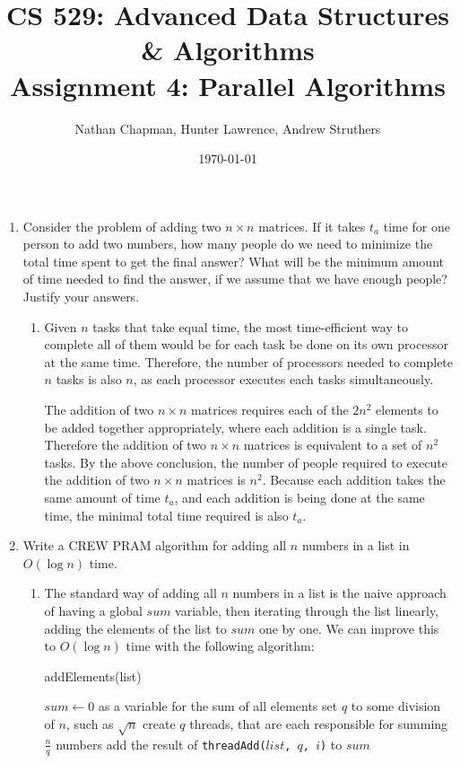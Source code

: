 \documentclass{article}
\title{\vspace*{-0.625in}CS 529: Advanced Data Structures \& Algorithms \\ Assignment 4: Parallel Algorithms}
\author{Nathan Chapman, Hunter Lawrence, Andrew Struthers}
\date{\today}
\renewcommand{\_}{\ifincsname_\else\legacyunderscore\fi}
\begin{document}
    \maketitle

\begin{enumerate}
	\item Consider the problem of adding two $n\times n$ matrices. If it takes $t_a$ time for one person to add two numbers, how many people do we need to minimize the total time spent to get the final answer? What will be the minimum amount of time needed to find the answer, if we assume that we have enough people? Justify your answers.
\begin{enumerate}
        \item

        Given $n$ tasks that take equal time, the most time-efficient way to complete all of them would be for each task be done on its own processor at the same time.  Therefore, the number of processors needed to complete $n$ tasks is also $n$, as each processor executes each tasks simultaneously.

        The addition of two $n \times n$ matrices requires each of the $2 n^2$ elements to be added together appropriately, where each addition is a single task.  Therefore the addition of two $n \times n$ matrices is equivalent to a set of $n^2$ tasks.  By the above conclusion, the number of people required to execute the addition of two $n \times n$ matrices is $n^2$. Because each addition takes the same amount of time $t_a$, and each addition is being done at the same time, the minimal total time required is also $t_a$.
\end{enumerate}
	\item Write a CREW PRAM algorithm for adding all $n$ numbers in a list in $O(\log n)$ time.
	\begin{enumerate}
		\item The standard way of adding all $n$ numbers in a list is the naive approach of having a global $sum$ variable, then iterating through the list linearly, adding the elements of the list to $sum$ one by one. We can improve this to $O(\log n)$ time with the following algorithm:

	\begin{function}
            \DontPrintSemicolon
            \caption{addElements(list)}
            \label{alg:addElements}
            $sum \gets 0$ as a variable for the sum of all elements\;
            set $q$ to some division of $n$, such as $\sqrt{n}$\;
            create $q$ threads, that are each responsible for summing $\frac{n}{q}$ numbers\;
            {
                add the result of \texttt{threadAdd($list$, $q$, $i$)} to $sum$
            }
        \end{function}


\end{enumerate}
\end{enumerate}
\end{document}
